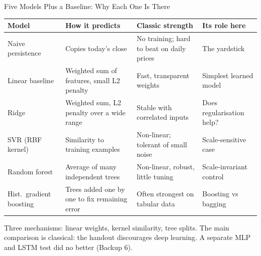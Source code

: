 \documentclass[aspectratio=169,11pt]{beamer}
\newcommand{\currentspeaker}{}
\newcommand{\speaker}[1]{\gdef\currentspeaker{#1}}
\newcommand{\repourl}{https://github.com/Steven-ZYC/INT4096-ML-Financial-Forecasting}
\newcommand{\currentrepolink}{}
\newcommand{\repolink}[2]{\gdef\currentrepolink{%
  \href{\repourl/#1/main/#2}{\color{accent}GitHub: \texttt{\detokenize{#2}}}}}
\begin{document}
\begin{frame}{Five Models Plus a Baseline: Why Each One Is There}
  \repolink{tree}{src/int4096/models}
  \speaker{Zhang Yancheng}
  \centering\scriptsize
  \renewcommand{\arraystretch}{1.12}
  \begin{tabular}{@{}l>{\raggedright\arraybackslash}p{.23\linewidth}>{\raggedright\arraybackslash}p{.25\linewidth}>{\raggedright\arraybackslash}p{.22\linewidth}@{}}
    \toprule
    \textbf{Model} & \textbf{How it predicts} & \textbf{Classic strength} & \textbf{Its role here} \\
    \midrule
    Naive persistence & Copies today's close & No training; hard to beat on daily prices & The yardstick \\
    Linear baseline & Weighted sum of features, small L2 penalty & Fast, transparent weights & Simplest learned model \\
    Ridge & Weighted sum, L2 penalty over a wide range & Stable with correlated inputs & Does regularisation help? \\
    SVR (RBF kernel) & Similarity to training examples & Non-linear; tolerant of small noise & Scale-sensitive case \\
    Random forest & Average of many independent trees & Non-linear, robust, little tuning & Scale-invariant control \\
    Hist.\ gradient boosting & Trees added one by one to fix remaining error & Often strongest on tabular data & Boosting vs bagging \\
    \bottomrule
  \end{tabular}
  \par\vspace{3mm}
  \raggedright\footnotesize
  Three mechanisms: linear weights, kernel similarity, tree splits. The main comparison is classical:
  the handout discourages deep learning. A separate MLP and LSTM test did no better (Backup 6).
\end{frame}
\end{document}
